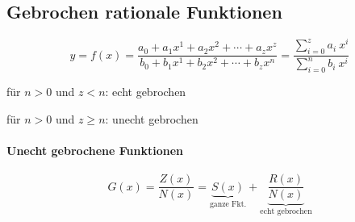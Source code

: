 \subsection{Gebrochen rationale Funktionen}

\[
	y = f(x) = \frac{a_0 + a_1 x^1 + a_2 x^2 + \cdots + a_z x^z}
	{b_0 + b_1 x^1 + b_2 x^2 + \cdots + b_z x^n}
	= \frac{\sum_{i=0}^{z} a_i\ x^i}{\sum_{i=0}^{n} b_i\ x^i}
\]

für \(n > 0\) und \(z < n\): echt gebrochen

für \(n > 0\) und \(z \geq n\): unecht gebrochen

\paragraph{Unecht gebrochene Funktionen}

\[
	G(x) = \frac{Z(x)}{N(x)} = \underbrace{S(x)}_{\text{ganze Fkt.}} + \underbrace{\frac{R(x)}{N(x)}}_{\text{echt gebrochen}}
\]






